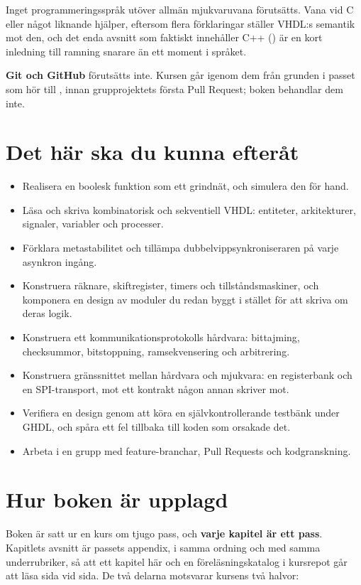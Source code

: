 Inget programmeringsspråk utöver allmän mjukvaruvana förutsätts. Vana vid C eller något liknande
hjälper, eftersom flera förklaringar ställer VHDL:s semantik mot den, och det enda avsnitt som
faktiskt innehåller C++ () är en kort inledning till ramning snarare än
ett moment i språket.

\textbf{Git och GitHub} förutsätts inte. Kursen går igenom dem från grunden i passet som hör till
, innan grupprojektets första Pull Request; boken behandlar dem inte.

\section*{Det här ska du kunna efteråt}
\begin{itemize}
  \item Realisera en boolesk funktion som ett grindnät, och simulera den för hand.
  \item Läsa och skriva kombinatorisk och sekventiell VHDL: entiteter, arkitekturer, signaler,
    variabler och processer.
  \item Förklara metastabilitet och tillämpa dubbelvippsynkroniseraren på varje asynkron ingång.
  \item Konstruera räknare, skiftregister, timers och tillståndsmaskiner, och komponera en design
    av moduler du redan byggt i stället för att skriva om deras logik.
  \item Konstruera ett kommunikationsprotokolls hårdvara: bittajming, checksummor, bitstoppning,
    ramsekvensering och arbitrering.
  \item Konstruera gränssnittet mellan hårdvara och mjukvara: en registerbank och en
    SPI-transport, mot ett kontrakt någon annan skriver mot.
  \item Verifiera en design genom att köra en självkontrollerande testbänk under GHDL, och spåra
    ett fel tillbaka till koden som orsakade det.
  \item Arbeta i en grupp med feature-branchar, Pull Requests och kodgranskning.
\end{itemize}

\section*{Hur boken är upplagd}
Boken är satt ur en kurs om tjugo pass, och \textbf{varje kapitel är ett pass}. Kapitlets avsnitt
är passets appendix, i samma ordning och med samma underrubriker, så att ett kapitel här och en
föreläsningskatalog i kursrepot går att läsa sida vid sida. De två delarna motsvarar kursens två
halvor:

